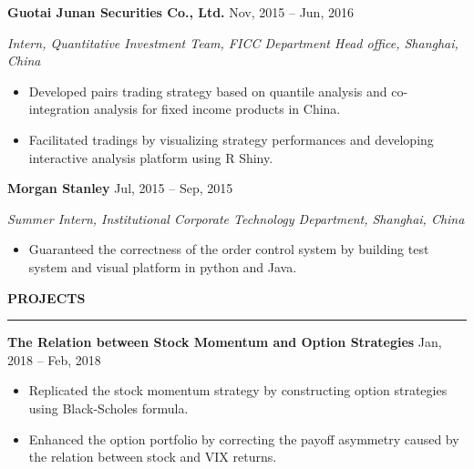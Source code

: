 \documentclass[a4paper,12pt]{report}
\newcommand{\marginAdj}{0.5in}
\begin{document}
\noindent 
\textbf{Guotai Junan Securities Co., Ltd.}{\fontsize{9pt}{9pt}\selectfont  \hspace*{3.15in}  \hspace*{\marginAdj} {\fontsize{10pt}{10pt}\selectfont Nov, 2015 – Jun, 2016}} \par
\noindent 
{\fontsize{10pt}{10pt}\selectfont \textit{Intern, Quantitative Investment Team, FICC Department Head office, Shanghai, China}} \par
\noindent 
\begin{itemize}[noitemsep,topsep=0pt]
\item {\fontsize{10pt}{10pt}\selectfont Developed pairs trading strategy based on quantile analysis and co-integration analysis for fixed income products in China.} \par
\item {\fontsize{10pt}{10pt}\selectfont Facilitated tradings by visualizing strategy performances and developing interactive analysis platform using R Shiny.} \par
\end{itemize}

\noindent 
\textbf{Morgan Stanley}{\fontsize{9pt}{9pt}\selectfont  \hspace*{4.4in} \hspace*{\marginAdj} {\fontsize{10pt}{10pt}\selectfont Jul, 2015 – Sep, 2015}} \par
\noindent 
{\fontsize{10pt}{10pt}\selectfont \textit{Summer Intern, Institutional Corporate Technology Department, Shanghai, China}} \par
\noindent 
\begin{itemize}[noitemsep,topsep=0pt]
\item {\fontsize{10pt}{10pt}\selectfont Guaranteed the correctness of the order control system by building test system and visual platform in python and Java.} \par
\end{itemize}
 \par
\vspace{9pt}



\noindent 
\textbf{PROJECTS} \par
\vspace{2pt}
\hrule
\vspace{6pt}

\noindent
\textbf{The Relation between Stock Momentum and Option Strategies}  \hspace*{\marginAdj}  \hspace*{1.00in} {\fontsize{10pt}{10pt}\selectfont Jan, 2018 – Feb, 2018} \par
\noindent 
\begin{itemize}[noitemsep,topsep=0pt]
	\item {\fontsize{10pt}{10pt}\selectfont Replicated the stock momentum strategy by constructing option strategies using Black-Scholes formula.} \par
	\item {\fontsize{10pt}{10pt}\selectfont Enhanced the option portfolio by correcting the payoff asymmetry caused by the relation between stock and VIX returns.} \par
\end{itemize}
\end{document}
